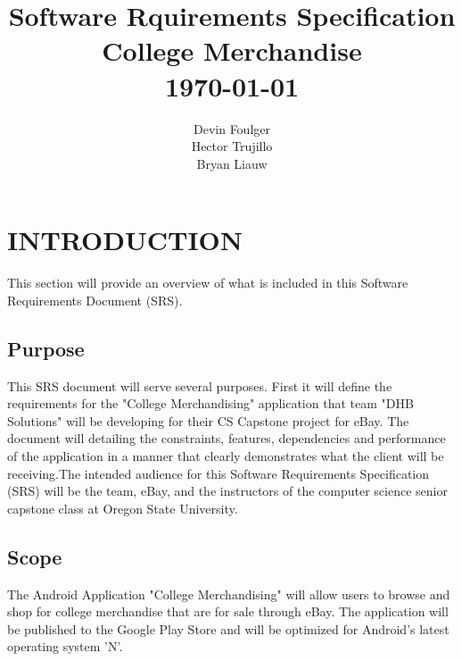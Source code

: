 \documentclass[journal,compsoc, 10pt, draftclsnofoot, onecolumn]{IEEEtran}
\begin{document}
\title{\vspace{20em}Software Rquirements Specification \\{\vspace{-1ex}\huge College Merchandise} \\ {\large \today}}
\author{\vspace{10ex}Devin Foulger \\{\vspace{-1ex}Hector Trujillo} \\{\vspace{-1ex}Bryan Liauw}}

\begin{titlepage}

\maketitle
\thispagestyle{empty}

\end{titlepage}

\tableofcontents

\section{INTRODUCTION}

This section will provide an overview of what is included in this Software 
Requirements Document (SRS).

\subsection{Purpose}

This SRS document will serve several purposes. First it will define the 
requirements for the "College Merchandising" application that team 
"DHB Solutions" will be developing for their CS Capstone project for eBay. The 
document will detailing the constraints, features, dependencies and performance 
of the application in a manner that clearly demonstrates what the client will be
 receiving.The intended audience for this Software Requirements Specification 
(SRS) will be the team, eBay, and the instructors of the computer science senior
 capstone class at Oregon State University. 

\subsection{Scope}

The Android Application "College Merchandising" will allow users to browse and 
shop for college merchandise that are for sale through eBay. The application 
will be published to the Google Play Store and will be optimized for Android's 
latest operating system 'N'. \newline
\end{document}
